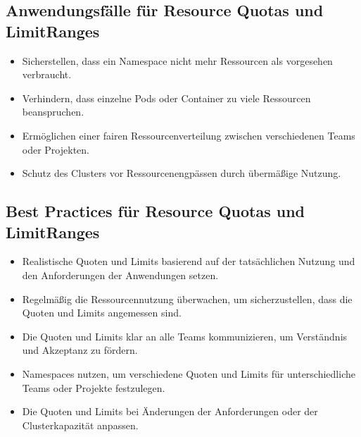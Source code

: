 \subsection{Anwendungsfälle für Resource Quotas und LimitRanges}
\begin{itemize}
    \item Sicherstellen, dass ein Namespace nicht mehr Ressourcen als vorgesehen verbraucht.
    \item Verhindern, dass einzelne Pods oder Container zu viele Ressourcen beanspruchen.
    \item Ermöglichen einer fairen Ressourcenverteilung zwischen verschiedenen Teams oder Projekten.
    \item Schutz des Clusters vor Ressourcenengpässen durch übermäßige Nutzung.
\end{itemize}

\subsection{Best Practices für Resource Quotas und LimitRanges}
\begin{itemize}
    \item Realistische Quoten und Limits basierend auf der tatsächlichen Nutzung und den Anforderungen der Anwendungen setzen.
    \item Regelmäßig die Ressourcennutzung überwachen, um sicherzustellen, dass die Quoten und Limits angemessen sind.
    \item Die Quoten und Limits klar an alle Teams kommunizieren, um Verständnis und Akzeptanz zu fördern.
    \item Namespaces nutzen, um verschiedene Quoten und Limits für unterschiedliche Teams oder Projekte festzulegen.
    \item Die Quoten und Limits bei Änderungen der Anforderungen oder der Clusterkapazität anpassen.
\end{itemize}

